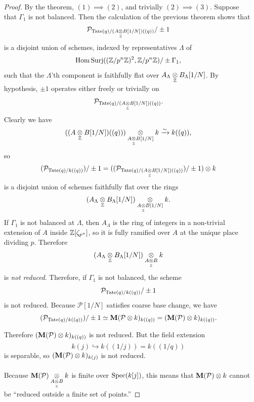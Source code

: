 \begin{proof}
By the theorem, $(1) \implies (2)$, and trivially $(2) \implies (3)$. Suppose that $\Gamma_1$ is not balanced. Then the calculation of the previous theorem shows that
\[
\mathcal{P}_{\mathrm{Tate}(q)/(A \underset{\mathbb{Z}}{\otimes} B[1/N])((q))}/\pm 1
\]
is a disjoint union of schemes, indexed by representatives $\Lambda$ of
\[
\mathrm{Hom\,Surj}((\mathbb{Z}/p^n\mathbb{Z})^2, \mathbb{Z}/p^n\mathbb{Z})/\pm\Gamma_1 ,
\]
such that the $\Lambda$'th component is faithfully flat over $A_\Lambda \underset{\mathbb{Z}}{\otimes} B_\Lambda[1/N]$. By hypothesis, $\pm 1$ operates either freely or trivially on
\[
\mathcal{P}_{\mathrm{Tate}(q)/(A \underset{\mathbb{Z}}{\otimes} B[1/N])((q))} .
\]
Clearly we have
\[
((A \underset{\mathbb{Z}}{\otimes} B[1/N])((q))) \underset{A \underset{\mathbb{Z}}{\otimes} B[1/N]}{\otimes} k \xrightarrow{\sim} k((q)) ,
\]
so
\[
(\mathcal{P}_{\mathrm{Tate}(q)/k((q))})/\pm 1 = ((\mathcal{P}_{\mathrm{Tate}(q)/(A \underset{\mathbb{Z}}{\otimes} B[1/N])((q))})/\pm 1) \underset{}{\otimes} k
\]
is a disjoint union of schemes faithfully flat over the rings
\[
(A_\Lambda \underset{\mathbb{Z}}{\otimes} B_\Lambda[1/N]) \underset{A \underset{\mathbb{Z}}{\otimes} B[1/N]}{\otimes} k .
\]
If $\Gamma_1$ is not balanced at $\Lambda$, then $A_\Lambda$ is the ring of integers in a non-trivial extension of $A$ inside $\mathbb{Z}[\zeta_{p^n}]$, so it is fully ramified over $A$ at the unique place dividing $p$. Therefore
\[
(A_\Lambda \underset{\mathbb{Z}}{\otimes} B_\Lambda[1/N]) \underset{A \underset{\mathbb{Z}}{\otimes} B}{\otimes} k
\]
is \emph{not reduced}. Therefore, if $\Gamma_1$ is not balanced, the scheme
\[
\mathcal{P}_{\mathrm{Tate}(q)/k((q))}/\pm 1
\]
is not reduced. Because $\mathcal{P}[1/N]$ satisfies coarse base change, we have
\[
(\mathcal{P}_{\mathrm{Tate}(q)/k((q))})/\pm 1 \simeq \mathbf{M}(\mathcal{P} \underset{}{\otimes} k)_{k((q))} = (\mathbf{M}(\mathcal{P}) \underset{}{\otimes} k)_{k((q))} .
\]
Therefore $(\mathbf{M}(\mathcal{P}) \underset{}{\otimes} k)_{k((q))}$ is not reduced. But the field extension
\[
k(j) \hookrightarrow k((1/j)) = k((1/q))
\]
is separable, so $(\mathbf{M}(\mathcal{P}) \underset{}{\otimes} k)_{k(j)}$ is not reduced.
\par
Because $\mathbf{M}(\mathcal{P}) \underset{A \underset{\mathbb{Z}}{\otimes} B}{\otimes} k$ is finite over $\operatorname{Spec}(k[j])$, this means that $\mathbf{M}(\mathcal{P}) \underset{}{\otimes} k$ cannot be ``reduced outside a finite set of points.''
\end{proof}

